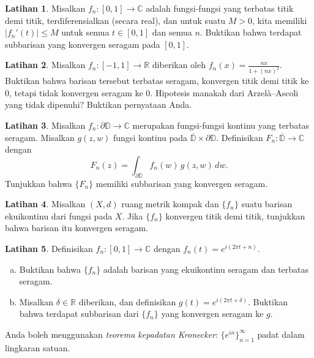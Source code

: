 \documentclass[12pt,openany]{book}
\newcommand{\sabs}[1]{\lvert {#1} \rvert}
\newcommand{\C}{{\mathbb{C}}}
\newcommand{\R}{{\mathbb{R}}}
\newcommand{\D}{{\mathbb{D}}}
\newcommand{\myindex}[1]{#1\index{#1}}
\theoremstyle{plain}
\theoremstyle{remark}
\theoremstyle{definition}
\newenvironment{exbox}{%
    \def\FrameCommand{\vrule width 1pt \relax\hspace{10pt}}%
    \MakeFramed{\advance\hsize-\width\FrameRestore}%
}{%
    \endMakeFramed
}
\newenvironment{exparts}{%
    \leavevmode\begin{enumerate}[a),noitemsep,topsep=0pt,parsep=0pt,partopsep=0pt]
}{%
    \end{enumerate}
}
\theoremstyle{exercise}
\newtheorem{exercise}{Latihan}[section]
\theoremstyle{example}
\begin{document}
\begin{exbox}
\begin{exercise}
Misalkan $f_n \colon [0,1] \to \C$ adalah fungsi-fungsi yang terbatas titik demi titik,
terdiferensialkan (secara real), dan untuk suatu $M> 0$, kita memiliki
$\sabs{f_n'(t)} \leq M$ untuk semua $t \in [0,1]$ dan semua $n$.  Buktikan bahwa terdapat
subbarisan yang konvergen seragam pada $[0,1]$.
\end{exercise}

\begin{exercise}
Misalkan $f_n \colon [-1,1] \to \R$ diberikan oleh $f_n(x) = \frac{nx}{1+{(nx)}^2}$.
Buktikan bahwa barisan tersebut terbatas seragam, konvergen titik demi titik ke $0$, tetapi
tidak konvergen seragam ke $0$.
Hipotesis manakah dari Arzel\`a--Ascoli
yang tidak dipenuhi?  Buktikan pernyataan Anda.
\end{exercise}

\begin{exercise}
Misalkan 
$f_n \colon \partial \D \to \C$ merupakan fungsi-fungsi kontinu yang terbatas seragam.
Misalkan $g(z,w)$ fungsi kontinu pada $\overline{\D} \times \partial \D$.
Definisikan
$F_n \colon \overline{\D} \to \C$ dengan
\begin{equation*}
F_n(z)  = \int_{\partial \D} f_n(w)\, g(z,w) \, dw . 
\end{equation*}
Tunjukkan bahwa $\{ F_n \}$ memiliki subbarisan yang konvergen seragam.
\end{exercise}

\begin{exercise}
Misalkan $(X,d)$ ruang metrik kompak dan $\{ f_n \}$ suatu barisan ekuikontinu
dari fungsi pada $X$.  Jika $\{ f_n \}$ konvergen
titik demi titik, tunjukkan bahwa barisan itu konvergen seragam.
\end{exercise}

\begin{exercise}
Definisikan $f_n \colon [0,1] \to \C$ dengan $f_n(t) = e^{i(2\pi t + n)}$.
\begin{exparts}
\item
Buktikan bahwa $\{ f_n \}$ adalah barisan yang ekuikontinu seragam
dan terbatas seragam.
\item
Misalkan $\delta \in \R$ diberikan, dan definisikan $g(t) = e^{i(2\pi t + \delta)}$.
Buktikan bahwa terdapat 
subbarisan dari $\{ f_n \}$ yang konvergen seragam ke $g$.
\end{exparts}
Anda boleh menggunakan \emph{\myindex{teorema kepadatan Kronecker}}:
$\{ e^{in} \}_{n=1}^\infty$ padat dalam lingkaran satuan.
\end{exercise}
\end{exbox}
\end{document}
